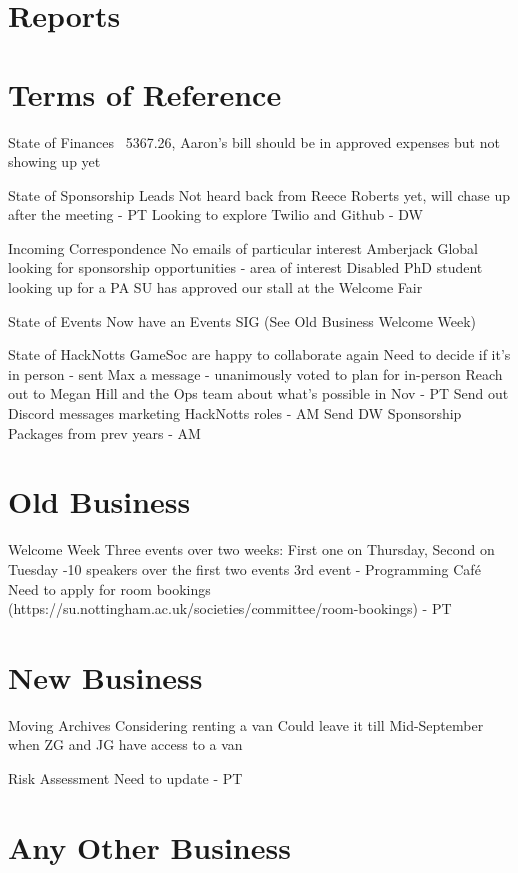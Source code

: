 \documentclass[11pt,hacksoc,agenda]{meetingmins}
\begin{document}
\maketitle

\section{Reports}

\section{Terms of Reference}
\begin{items}
\item {State of Finances}
    \subitem ~5367.26, Aaron's bill should be in approved expenses but not showing up yet 
\item {State of Sponsorship Leads}
    \subitem Not heard back from Reece Roberts yet, will chase up after the meeting - PT
    \subitem Looking to explore Twilio and Github - DW
\item {Incoming Correspondence}
    \subitem No emails of particular interest
    \subitem Amberjack Global looking for sponsorship opportunities - area of interest
    \subitem Disabled PhD student looking up for a PA  
    \subitem SU has approved our stall at the Welcome Fair
\item {State of Events}
    \subitem Now have an Events SIG (See Old Business Welcome Week)
\item {State of HackNotts}
    \subitem GameSoc are happy to collaborate again
    \subitem Need to decide if it's in person - sent Max a message - unanimously voted to plan for in-person
    \subitem Reach out to Megan Hill and the Ops team about what's possible in Nov - PT
    \subitem Send out Discord messages marketing HackNotts roles - AM
    \subitem Send DW Sponsorship Packages from prev years - AM
\end{items}

\section{Old Business}
\begin{items}
\item {Welcome Week} 
    \subitem Three events over two weeks: First one on Thursday, Second on Tuesday
    -10 speakers over the first two events
    \subitem 3rd event - Programming Café
    \subitem Need to apply for room bookings (https://su.nottingham.ac.uk/societies/committee/room-bookings) - PT
\end{items}

\section{New Business}
\begin{items}
\item {Moving Archives}
    \subitem Considering renting a van
    \subitem Could leave it till Mid-September when ZG and JG have access to a van
\item {Risk Assessment}
    \subitem Need to update - PT
\end{items}

\section{Any Other Business}

\vspace{1em}
\end{document}
